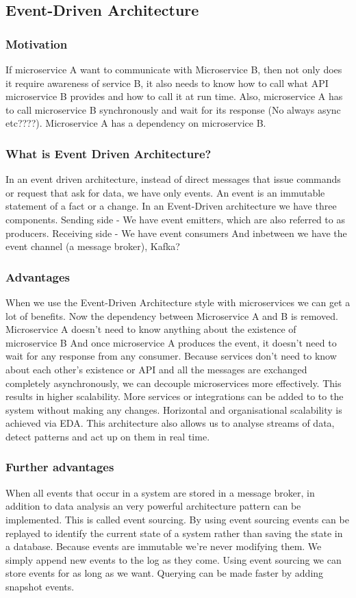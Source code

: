 \subsection{Event-Driven Architecture}

\subsubsection{Motivation}
If microservice A want to communicate with Microservice B, then not only does it require awareness of service B, it also needs to know how to call what API microservice B provides and how to call it at run time.
Also, microservice A has to call microservice B synchronously and wait for its response (No always async etc????).
Microservice A has a dependency on microservice B\@.

\subsubsection{What is Event Driven Architecture?}
In an event driven architecture, instead of direct messages that issue commands or request that ask for data, we have only events.
An event is an immutable statement of a fact or a change.
In an Event-Driven architecture we have three components.
Sending side - We have event emitters, which are also referred to as producers.
Receiving side - We have event consumers
And inbetween we have the event channel (a message broker), Kafka?

\subsubsection{Advantages}
When we use the Event-Driven Architecture style with microservices we can get a lot of benefits.
Now the dependency between Microservice A and B is removed.
Microservice A doesn't need to know anything about the existence of microservice B
And once microservice A produces the event, it doesn't need to wait for any response from any consumer.
Because services don't need to know about each other's existence or API and all the messages are exchanged completely asynchronously, we can decouple microservices more effectively.
This results in higher scalability.
More services or integrations can be added to to the system without making any changes.
Horizontal and organisational scalability is achieved via EDA.
This architecture also allows us to analyse streams of data, detect patterns and act up on them in real time.

\subsubsection{Further advantages}
When all events that occur in a system are stored in a message broker, in addition to data analysis an very powerful architecture pattern can be implemented.
This is called event sourcing.
By using event sourcing events can be replayed to identify the current state of a system rather than saving the state in a database.
Because events are immutable we're never modifying them.
We simply append new events to the log as they come.
Using event sourcing we can store events for as long as we want.
Querying can be made faster by adding snapshot events.

